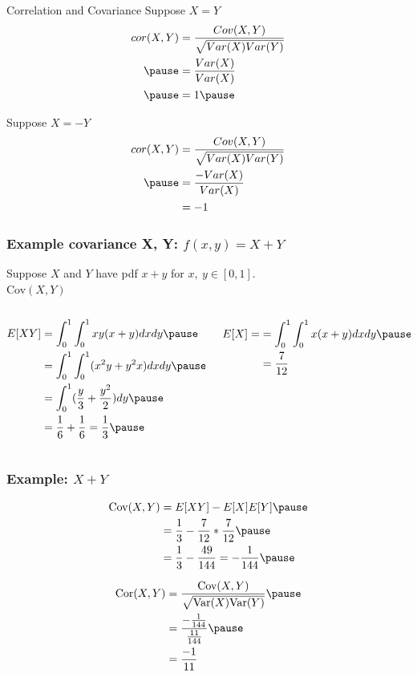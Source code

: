 \documentclass[aspectratio=169, handout]{beamer}
\numberwithin{equation}{section}
\begin{document}
\begin{frame}{Correlation and Covariance}
Suppose $X = Y$ \pause 
\begin{align*}
cor(X,Y) &= \frac{Cov(X,Y)}{\sqrt{Var(X)Var(Y)} }  \\ \pause 
&= \frac{Var(X)}{Var(X)}  \\ \pause 
&= 1   \pause 
\end{align*}

Suppose $X = -Y$  \pause 
\begin{align*}
cor(X,Y) &= \frac{Cov(X,Y)}{\sqrt{Var(X)Var(Y)} } \\ \pause 
& =   \frac{- Var(X)}{Var(X)}  \\
& =   -1
\end{align*}

\end{frame}

\begin{frame}
\frametitle{Example covariance X, Y: $f(x,y)=X + Y$} 
Suppose $X$ and $Y$ have pdf $x + y$ for $x,\ y \in [0,1]$.  \pause \\
Cov$(X,Y)$  \pause 
\begin{columns}
\begin{column}{0.5\textwidth}
\begin{align*}
E[XY] &= \int_{0}^{1} \int_{0}^{1} xy (x + y) dx dy \pause \\
&= \int_{0}^{1} \int_{0}^{1} (x^2 y + y^2 x) dx dy   \pause \\
&= \int_{0}^{1} (\frac{y}{3} + \frac{y^2}{2} ) dy  \pause \\
&= \frac{1}{6} + \frac{1}{6} = \frac{1}{3} \pause  
\end{align*}
\end{column}
\begin{column}{0.5\textwidth}
\begin{align*}
E[X]= &= \int_{0}^{1} \int_{0}^{1} x (x + y) dxdy  \pause \\
 &= \frac{7}{12} 
 \end{align*}
 \end{column}
\end{columns}

\end{frame}




\begin{frame}
\frametitle{Example: $X + Y$ } 

\begin{align*}
\text{Cov}(X,Y) &=  E[XY] - E[X]E[Y]   \pause \\
&= \frac{1}{3}  - \frac{7}{12} *\frac{7}{12}   \pause \\
&= \frac{1}{3}  - \frac{49}{144} = -\frac{1}{144}   \pause 
\end{align*}

\begin{align*}
\text{Cor}(X,Y) &= \frac{\text{Cov}(X,Y)}{\sqrt{\text{Var}(X) \text{Var}(Y) }} \pause \\
&= \frac{- \frac{1}{144}}{\frac{11}{144}}  \pause  \\
&= \frac{-1}{11}  
\end{align*}


\end{frame}
\end{document}
